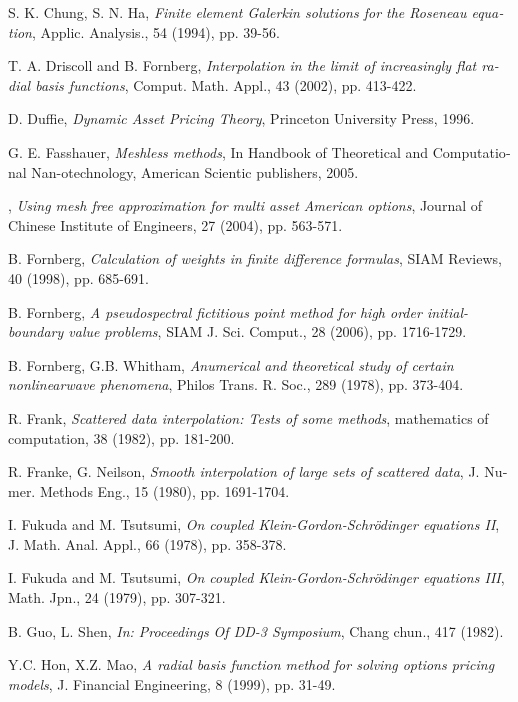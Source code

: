 \begin{thebibliography}{99}
\begin{latin}
\bibitem{[46]} {\sc S. K. Chung, S. N. Ha},
{\em Finite element Galerkin solutions for the Roseneau equation},
Applic. Analysis., 54 (1994), pp. 39-56.

\bibitem{[5]} {\sc T. A. Driscoll and B. Fornberg}, { \em Interpolation in the limit of increasingly flat
radial basis functions}, Comput. Math. Appl., 43 (2002), pp.
413-422.

\bibitem{[51]} {\sc D. Duffie}, {\em Dynamic Asset Pricing Theory}, Princeton
University Press, 1996.

\bibitem {[76]} {\sc G. E. Fasshauer}, {\em Meshless methods}, In Handbook of Theoretical
and Computational Nan-otechnology, American Scientic publishers,
2005.

, {\em Using mesh free
approximation for multi asset American options},  Journal of
Chinese Institute of Engineers, 27 (2004), pp. 563-571.

\bibitem {[30]} {\sc B. Fornberg}, {\em Calculation of weights in finite
difference formulas}, SIAM Reviews, 40 (1998), pp. 685-691.

\bibitem{[80]} {\sc B. Fornberg}, {\em A pseudospectral fictitious point method for high order
initial-boundary value problems}, SIAM J. Sci. Comput., 28 (2006), pp.
1716-1729.

\bibitem{[43]} {\sc B. Fornberg, G.B. Whitham}, {\em Anumerical and theoretical study of certain nonlinearwave phenomena},
Philos Trans. R. Soc., 289 (1978), pp. 373-404.

\bibitem{[74]} {\sc R. Frank}, {\em Scattered data interpolation: Tests of
some methods}, mathematics of computation, 38 (1982), pp. 181-200.

\bibitem{[75]} {\sc R. Franke, G. Neilson}, {\em Smooth interpolation of large
sets of scattered data}, J. Numer. Methods Eng.,  15 (1980), pp.
1691-1704.

\bibitem{[61]} {\sc I. Fukuda and M. Tsutsumi}, {\em On coupled Klein-Gordon-Schr\"{o}dinger equations
 II}, J. Math. Anal. Appl., 66 (1978), pp. 358-378.

\bibitem{[64]} {\sc I. Fukuda and M. Tsutsumi},  {\em On coupled Klein-Gordon-Schr\"{o}dinger equations
III}, Math. Jpn., 24 (1979), pp. 307-321.

\bibitem {[20]} {\sc B. Guo, L. Shen}, {\em In: Proceedings Of DD-3 Symposium},
Chang chun., 417 (1982).

\bibitem{[55]} {\sc Y.C. Hon, X.Z. Mao}, {\em A radial basis function method for solving options pricing
models}, J. Financial Engineering, 8 (1999), pp. 31-49.


\end{latin}
\end{thebibliography}

